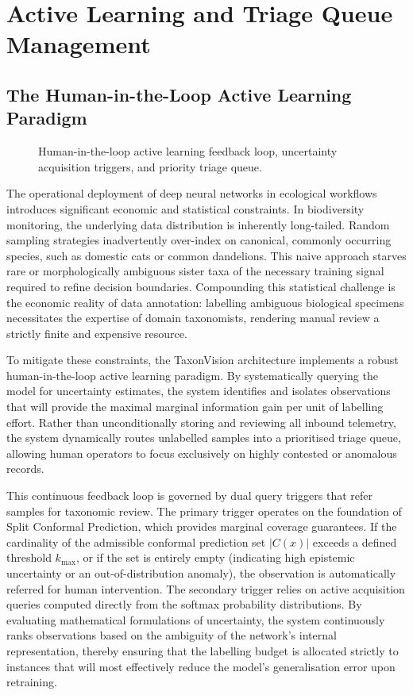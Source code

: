 \chapter{Active Learning and Triage Queue Management}
\label{ch:active_learning}

\section{The Human-in-the-Loop Active Learning Paradigm}
\label{sec:al_paradigm}

\begin{figure}[htbp]
\centering

\caption{Human-in-the-loop active learning feedback loop, uncertainty acquisition triggers, and priority triage queue.}
\label{fig:active_learning_triage_queue}
\end{figure}

The operational deployment of deep neural networks in ecological workflows introduces significant economic and statistical constraints. In biodiversity monitoring, the underlying data distribution is inherently long-tailed. Random sampling strategies inadvertently over-index on canonical, commonly occurring species, such as domestic cats or common dandelions. This naive approach starves rare or morphologically ambiguous sister taxa of the necessary training signal required to refine decision boundaries. Compounding this statistical challenge is the economic reality of data annotation: labelling ambiguous biological specimens necessitates the expertise of domain taxonomists, rendering manual review a strictly finite and expensive resource.

To mitigate these constraints, the TaxonVision architecture implements a robust human-in-the-loop active learning paradigm. By systematically querying the model for uncertainty estimates, the system identifies and isolates observations that will provide the maximal marginal information gain per unit of labelling effort. Rather than unconditionally storing and reviewing all inbound telemetry, the system dynamically routes unlabelled samples into a prioritised triage queue, allowing human operators to focus exclusively on highly contested or anomalous records.

This continuous feedback loop is governed by dual query triggers that refer samples for taxonomic review. The primary trigger operates on the foundation of Split Conformal Prediction, which provides marginal coverage guarantees. If the cardinality of the admissible conformal prediction set $|C(x)|$ exceeds a defined threshold $k_{\text{max}}$, or if the set is entirely empty (indicating high epistemic uncertainty or an out-of-distribution anomaly), the observation is automatically referred for human intervention. The secondary trigger relies on active acquisition queries computed directly from the softmax probability distributions. By evaluating mathematical formulations of uncertainty, the system continuously ranks observations based on the ambiguity of the network's internal representation, thereby ensuring that the labelling budget is allocated strictly to instances that will most effectively reduce the model's generalisation error upon retraining.


